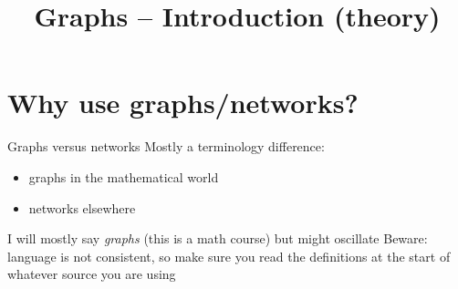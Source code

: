 \documentclass[aspectratio=43]{beamer}
\title{Graphs -- Introduction (theory)}
\date{}
\begin{document}
\begin{frame}
	\titlepage
\end{frame}



\section{Why use graphs/networks?}
\begin{frame}{Graphs versus networks}
	Mostly a terminology difference:
	\begin{itemize}
	\item graphs in the mathematical world
	\item networks elsewhere
	\end{itemize}
	\vfill
	I will mostly say \emph{graphs} (this is a math course) but might oscillate
	\vfill
	Beware: language is not consistent, so make sure you read the definitions at the start of whatever source you are using
\end{frame}
\end{document}
